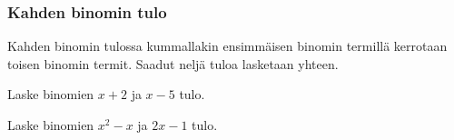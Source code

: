 \subsubsection*{Kahden binomin tulo}

Kahden binomin tulossa kummallakin ensimmäisen binomin termillä kerrotaan toisen binomin termit. Saadut neljä tuloa lasketaan yhteen. 

\newcommand{\pbezier}[4]{
	\pgfmathsetmacro{\PBxa}{#1}
	\pgfmathsetmacro{\PBxb}{#2}
	\pgfmathsetmacro{\PBya}{#3}
	\pgfmathsetmacro{\PByb}{#3+#4}
	\pgfmathsetmacro{\PBca}{0.8 * \PBxa + 0.2 * \PBxb}
	\pgfmathsetmacro{\PBcb}{0.2 * \PBxa + 0.8 * \PBxb}
	\draw[color=red] (\PBxa, \PBya) .. controls (\PBca, \PByb) and (\PBcb, \PByb) .. (\PBxb, \PBya);
}

\begin{esimerkki}
Laske binomien $x+2$ ja $x-5$ tulo. \\
\newline
\end{esimerkki}

\begin{esimerkki}
Laske binomien $x^2-x$ ja $2x-1$ tulo. \\
\newline
\end{esimerkki}

